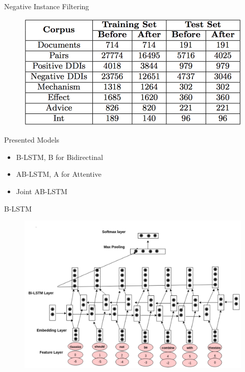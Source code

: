 \documentclass[xcolor={dvipsnames}]{beamer}
\begin{document}
\begin{frame}{\insertsubsection}

\begin{exampleblock}{Negative Instance Filtering}
\begin{figure}[ht]
\centering
\includegraphics[scale=0.35]{table1.png}
\end{figure}
\end{exampleblock}

\end{frame}

\begin{frame}{\insertsubsection}

\begin{exampleblock}{Presented Models}

\begin{itemize}
\item B-LSTM, B for Bidirectinal
\item AB-LSTM, A for Attentive
\item Joint AB-LSTM
\end{itemize}

\end{exampleblock}

\end{frame}


\begin{frame}{\insertsubsection}

\begin{exampleblock}{B-LSTM}
\begin{figure}[ht]
\centering
\includegraphics[scale=0.255]{fig1.png}
\end{figure}
\end{exampleblock}

\end{frame}
\end{document}
